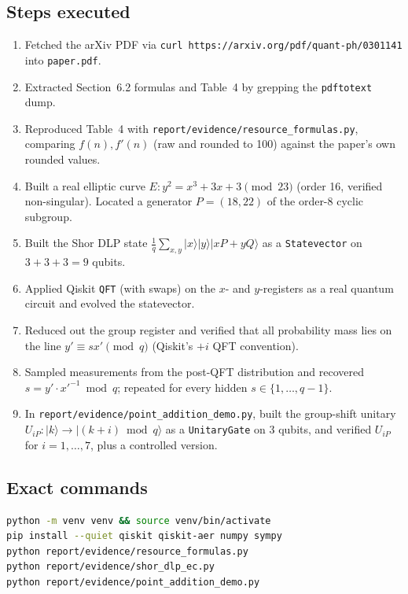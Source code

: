 \documentclass[10pt,letterpaper]{article}
\begin{document}
\subsection{Steps executed}
\begin{enumerate}
  \item Fetched the arXiv PDF via \verb|curl https://arxiv.org/pdf/quant-ph/0301141| into \texttt{paper.pdf}.
  \item Extracted Section~6.2 formulas and Table~4 by grepping the \texttt{pdftotext} dump.
  \item Reproduced Table~4 with \texttt{report/evidence/resource\_formulas.py}, comparing $f(n),f'(n)$ (raw and rounded to 100) against the paper's own rounded values.
  \item Built a real elliptic curve $E:y^2=x^3+3x+3\pmod{23}$ (order 16, verified non-singular).  Located a generator $P=(18,22)$ of the order-8 cyclic subgroup.
  \item Built the Shor DLP state $\tfrac1q\sum_{x,y}|x\rangle|y\rangle|xP+yQ\rangle$ as a \texttt{Statevector} on $3+3+3=9$ qubits.
  \item Applied Qiskit \verb|QFT| (with swaps) on the $x$- and $y$-registers as a real quantum circuit and evolved the statevector.
  \item Reduced out the group register and verified that all probability mass lies on the line $y'\equiv sx'\pmod q$ (Qiskit's $+i$ QFT convention).
  \item Sampled measurements from the post-QFT distribution and recovered $s=y'\cdot x'^{-1}\bmod q$; repeated for every hidden $s\in\{1,\dots,q-1\}$.
  \item In \texttt{report/evidence/point\_addition\_demo.py}, built the group-shift unitary $U_{iP}:|k\rangle\!\to\!|(k{+}i)\bmod q\rangle$ as a \texttt{UnitaryGate} on 3 qubits, and verified $U_{iP}$ for $i=1{,}\dots{,}7$, plus a controlled version.
\end{enumerate}

\subsection{Exact commands}
\begin{lstlisting}[language=bash]
python -m venv venv && source venv/bin/activate
pip install --quiet qiskit qiskit-aer numpy sympy
python report/evidence/resource_formulas.py
python report/evidence/shor_dlp_ec.py
python report/evidence/point_addition_demo.py
\end{lstlisting}
\end{document}
